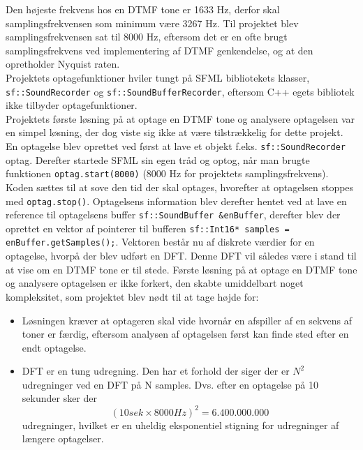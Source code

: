 Den højeste frekvens hos en DTMF tone er 1633 Hz, derfor skal samplingsfrekvensen som minimum være 3267 Hz. Til projektet blev samplingsfrekvensen sat til 8000 Hz, eftersom det er en ofte brugt samplingsfrekvens ved implementering af DTMF genkendelse, og at den opretholder Nyquist raten.
\\
\newline
Projektets optagefunktioner hviler tungt på SFML bibliotekets klasser, \texttt{sf::\textcolor{dkgreen}{SoundRecorder}} og \texttt{sf::\textcolor{dkgreen}{SoundBufferRecorder}}, eftersom C++ egets bibliotek ikke tilbyder optagefunktioner.
\\
\newline
Projektets første løsning på at optage en DTMF tone og analysere optagelsen var en simpel løsning, der dog viste sig ikke at være tilstrækkelig for dette projekt.
\newline
En optagelse blev oprettet ved først at lave et objekt f.eks. \texttt{sf::\textcolor{dkgreen}{SoundRecorder}} optag.
\newline
Derefter startede SFML sin egen tråd og optog, når man brugte funktionen \texttt{optag.start(8000)} (8000 Hz for projektets samplingsfrekvens). Koden sættes til at sove den tid der skal optages, hvorefter at optagelsen stoppes med \texttt{optag.stop()}. Optagelsens information blev derefter hentet ved at lave en reference til optagelsens buffer \texttt{sf::\textcolor{dkgreen}{SoundBuffer} \&enBuffer}, derefter blev der oprettet en vektor af pointerer til bufferen \texttt{sf::\textcolor{dkgreen}{Int16*} samples = enBuffer.getSamples();}. Vektoren består nu af diskrete værdier for en optagelse, hvorpå der blev udført en DFT. Denne DFT vil således være i stand til at vise om en DTMF tone er til stede.
\newline
Første løsning på at optage en DTMF tone og analysere optagelsen er ikke forkert, den skabte umiddelbart noget kompleksitet, som projektet blev nødt til at tage højde for:
\begin{itemize}
	\item Løsningen kræver at optageren skal vide hvornår en afspiller af en sekvens af toner er færdig, eftersom analysen af optagelsen først kan finde sted efter en endt optagelse.
	
	\item DFT er en tung udregning. Den har et forhold der siger der er $N^2$ udregninger ved en DFT på N samples. Dvs. efter en optagelse på 10 sekunder sker der
	$$(10 sek \times 8000 Hz)^2 = 6.400.000.000$$
	udregninger, hvilket er en uheldig eksponentiel stigning for udregninger af længere optagelser.
\end{itemize}
